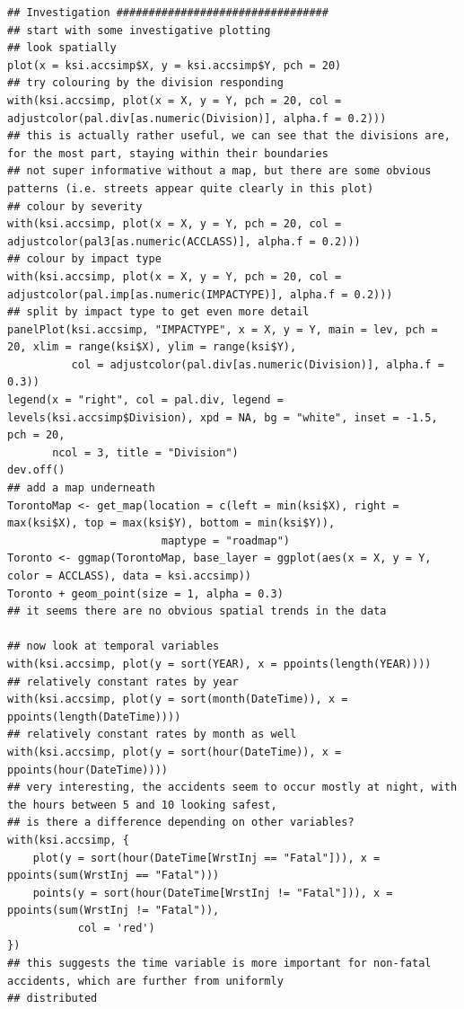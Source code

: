 \documentclass{article}
\begin{document}
\begin{lstlisting}
## Investigation #################################
## start with some investigative plotting
## look spatially
plot(x = ksi.accsimp$X, y = ksi.accsimp$Y, pch = 20)
## try colouring by the division responding
with(ksi.accsimp, plot(x = X, y = Y, pch = 20, col = adjustcolor(pal.div[as.numeric(Division)], alpha.f = 0.2)))
## this is actually rather useful, we can see that the divisions are, for the most part, staying within their boundaries
## not super informative without a map, but there are some obvious patterns (i.e. streets appear quite clearly in this plot)
## colour by severity
with(ksi.accsimp, plot(x = X, y = Y, pch = 20, col = adjustcolor(pal3[as.numeric(ACCLASS)], alpha.f = 0.2)))
## colour by impact type
with(ksi.accsimp, plot(x = X, y = Y, pch = 20, col = adjustcolor(pal.imp[as.numeric(IMPACTYPE)], alpha.f = 0.2)))
## split by impact type to get even more detail
panelPlot(ksi.accsimp, "IMPACTYPE", x = X, y = Y, main = lev, pch = 20, xlim = range(ksi$X), ylim = range(ksi$Y),
          col = adjustcolor(pal.div[as.numeric(Division)], alpha.f = 0.3))
legend(x = "right", col = pal.div, legend = levels(ksi.accsimp$Division), xpd = NA, bg = "white", inset = -1.5, pch = 20,
       ncol = 3, title = "Division")
dev.off()
## add a map underneath
TorontoMap <- get_map(location = c(left = min(ksi$X), right = max(ksi$X), top = max(ksi$Y), bottom = min(ksi$Y)),
                        maptype = "roadmap")
Toronto <- ggmap(TorontoMap, base_layer = ggplot(aes(x = X, y = Y, color = ACCLASS), data = ksi.accsimp))
Toronto + geom_point(size = 1, alpha = 0.3)
## it seems there are no obvious spatial trends in the data

## now look at temporal variables
with(ksi.accsimp, plot(y = sort(YEAR), x = ppoints(length(YEAR))))
## relatively constant rates by year
with(ksi.accsimp, plot(y = sort(month(DateTime)), x = ppoints(length(DateTime))))
## relatively constant rates by month as well
with(ksi.accsimp, plot(y = sort(hour(DateTime)), x = ppoints(hour(DateTime))))
## very interesting, the accidents seem to occur mostly at night, with the hours between 5 and 10 looking safest,
## is there a difference depending on other variables?
with(ksi.accsimp, {
    plot(y = sort(hour(DateTime[WrstInj == "Fatal"])), x = ppoints(sum(WrstInj == "Fatal")))
    points(y = sort(hour(DateTime[WrstInj != "Fatal"])), x = ppoints(sum(WrstInj != "Fatal")),
           col = 'red')
})
## this suggests the time variable is more important for non-fatal accidents, which are further from uniformly
## distributed


\end{lstlisting}
\end{document}
